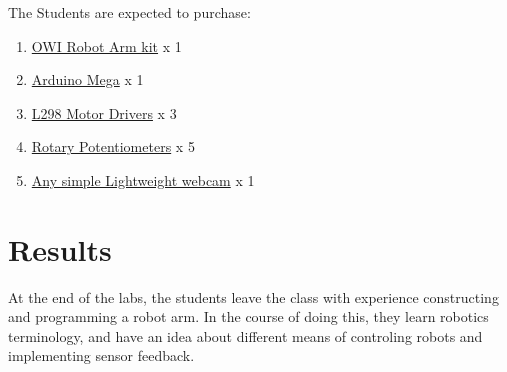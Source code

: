The Students are expected to purchase:
\begin{enumerate}
\item \href{https://www.amazon.com/dp/B0017OFRCY/}{OWI Robot Arm kit} x 1
\item \href{https://www.amazon.com/dp/B0046AMGW0/}{Arduino Mega}  x 1
\item \href{https://www.amazon.com/dp/B00XAGRQTO}{L298 Motor Drivers}  x 3
\item \href{https://www.amazon.com/dp/B07CZXCBWD}{Rotary Potentiometers} x 5
\item \href{ https://www.amazon.com/dp/B00NBL2KK8/}{Any simple Lightweight webcam}  x 1
\end{enumerate}




\section{Results}

At the end of the labs, the students leave the class with experience constructing and programming a robot arm. In the course of doing this, they learn robotics terminology, and have an idea about different means of controling robots and implementing sensor feedback. 
